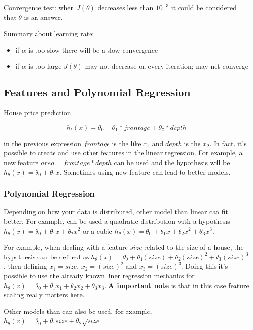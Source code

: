 \documentclass[a4paper]{article}
\begin{document}
Convergence test: when $J(\theta)$ decreases less than $10^{-3}$ it could be considered that $\theta$ is an answer.

Summary about learning rate:

\begin{itemize}
\item if $\alpha$ is too slow there will be a slow convergence
\item if $\alpha$ is too large $J(\theta)$ may not decrease on every iteration; may not converge
\end{itemize}


\subsection{Features and Polynomial Regression}

House price prediction

\[h_\theta(x) = \theta_0 + \theta_1 * frontage + \theta_2 * depth \]

in the previous expression $frontage$ is the like $x_1$ and $depth$ is the $x_2$. In fact, it's possible to create and use other features in the linear regression. For example, a new feature $area = frontage * depth$ can be used and the hypothesis will be $h_\theta(x) = \theta_0 + \theta_1 x$. Sometimes using new feature can lead to better models.

\subsubsection{Polynomial Regression}

Depending on how your data is distributed, other model than linear can fit better. For example, can be used a quadratic distribution with a hypothesis $h_\theta(x) = \theta_0 + \theta_1 x + \theta_2 x^2$ or a cubic $h_\theta(x) = \theta_0 + \theta_1 x + \theta_2 x^2 + \theta_3 x^3$.

For example, when dealing with a feature $size$ related to the size of a house, the hypothesis can be defined as $h_\theta(x) = \theta_0 + \theta_1 (size) + \theta_2 (size)^2 + \theta_3 (size)^3$, then defining $x_1 = size$, $x_2 = (size)^2$ and $x_3 = (size)^3$. Doing this it's possible to use the already known liner regression mechanics for $h_\theta(x) = \theta_0 + \theta_1 x_1 + \theta_2 x_2 + \theta_3 x_3$. \textbf{A important note} is that in this case feature scaling really matters here.

Other models than can also be used, for example, $h_\theta(x) = \theta_0 + \theta_1 size + \theta_2 \sqrt{size}$.
\end{document}
